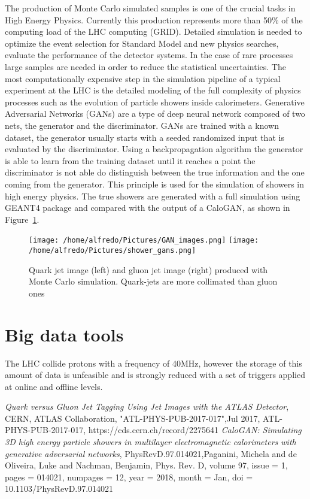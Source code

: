 \documentclass{PoS}
\begin{document}
The production of Monte Carlo simulated samples is one of the crucial tasks in High Energy Physics. Currently this production represents
more than 50\% of the computing load of the LHC computing (GRID). Detailed simulation is needed to optimize the event selection for Standard
Model and new physics searches, evaluate the performance of the detector systems. In the case of rare processes large samples are needed in
order to reduce the statistical uncertainties. The most computationally expensive step in the simulation pipeline of a typical experiment at the
LHC is the detailed modeling of the full complexity of physics processes such as the evolution of particle showers inside calorimeters. 
Generative Adversarial Networks (GANs) are a type of deep neural network composed of two nets, the generator and the discriminator.  GANs are
trained with a known dataset, the generator usually starts with a seeded randomized input that is evaluated by the discriminator. Using a
backpropagation algorithm the generator is able to learn from the training dataset until it reaches a point the discriminator is not able do
distinguish between the true information and the one coming from the generator.  This principle is used for the simulation of showers in
high energy physics.  The true showers are generated with a full simulation using GEANT4 package and compared with the output of a CaloGAN,
as shown in Figure~\ref{fig:jet_images}.


\begin{figure}
\begin{center}
  \texttt{[image: /home/alfredo/Pictures/GAN\_images.png]}
  \texttt{[image: /home/alfredo/Pictures/shower\_gans.png]}
  \caption{Quark jet image (left) and gluon jet image (right) produced with Monte Carlo simulation. Quark-jets are more collimated than gluon ones}
  \label{fig:jet_images}
\end{center}
\end{figure}


\section{Big data tools}

The LHC collide protons with a frequency of 40MHz, however the storage of this amount of data is unfeasible and is strongly reduced with a
set of triggers applied at online and offline levels. 





\begin{thebibliography}{99}
  \emph{Quark versus Gluon Jet Tagging Using Jet Images with the ATLAS Detector}, CERN, ATLAS Collaboration, "ATL-PHYS-PUB-2017-017",Jul 2017, ATL-PHYS-PUB-2017-017, https://cds.cern.ch/record/2275641
  \emph{CaloGAN: Simulating 3D high energy particle showers in multilayer electromagnetic calorimeters with generative adversarial networks},
  PhysRevD.97.014021,Paganini, Michela and de Oliveira, Luke and Nachman, Benjamin, Phys. Rev. D, volume 97, issue = 1, pages = 014021, numpages = 12, year = 2018,
  month = {Jan}, doi = {10.1103/PhysRevD.97.014021}
\end{thebibliography}
\end{document}
